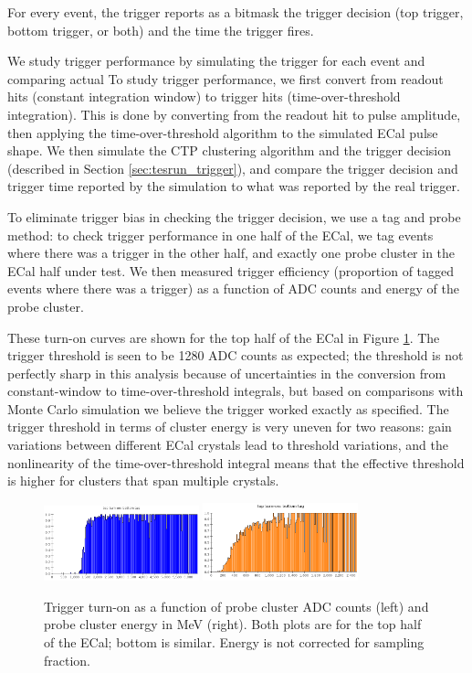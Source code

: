 For every event, the trigger reports as a bitmask the trigger decision (top trigger, bottom trigger, or both) and the time the trigger fires.

We study trigger performance by simulating the trigger for each event and comparing actual To study trigger performance, we first convert from readout hits (constant integration window) to trigger hits (time-over-threshold integration). 
This is done by converting from the readout hit to pulse amplitude, then applying the time-over-threshold algorithm to the simulated ECal pulse shape. 
We then simulate the CTP clustering algorithm and the trigger decision (described in Section \ref{sec:tesrun_trigger}), and compare the trigger decision and trigger time reported by the simulation to what was reported by the real trigger.

To eliminate trigger bias in checking the trigger decision, we use a tag and probe method: to check trigger performance in one half of the ECal, we tag events where there was a trigger in the other half, and exactly one probe cluster in the ECal half under test. 
We then measured trigger efficiency (proportion of tagged events where there was a trigger) as a function of ADC counts and energy of the probe cluster.

These turn-on curves are shown for the top half of the ECal in Figure \ref{fig:turnon}. 
The trigger threshold is seen to be 1280 ADC counts as expected; the threshold is not perfectly sharp in this analysis because of uncertainties in the conversion from constant-window to time-over-threshold integrals, but based on comparisons with Monte Carlo simulation we believe the trigger worked exactly as specified. 
The trigger threshold in terms of cluster energy is very uneven for two reasons: gain variations between different ECal crystals lead to threshold variations, and the nonlinearity of the time-over-threshold integral means that the effective threshold is higher for clusters that span multiple crystals.

\begin{figure}[ht]
	\includegraphics[width=0.4\textwidth]{test2012/ecalperformance/top_turnon_adc}
	\includegraphics[width=0.4\textwidth]{test2012/ecalperformance/top_turnon_e}
	\caption{\small{Trigger turn-on as a function of probe cluster ADC counts (left) and probe cluster energy in MeV (right). Both plots are for the top half of the ECal; bottom is similar. 
	Energy is not corrected for sampling fraction.}}
	\label{fig:turnon}
\end{figure}

